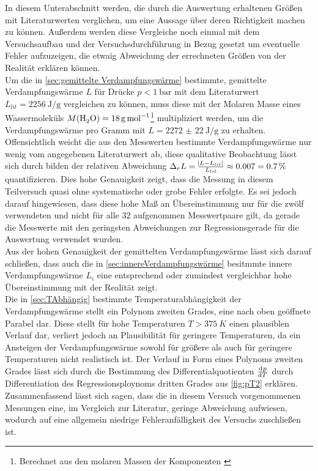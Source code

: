 In diesem Unterabschnitt werden, die durch die Auswertung erhaltenen
Größen mit Literaturwerten verglichen, um eine Aussage über deren 
Richtigkeit machen zu können. Außerdem werden diese Vergleiche noch
einmal mit dem Versuchsaufbau und der Versuchsdurchführung in Bezug
gesetzt um eventuelle Fehler aufzuzeigen, die etwaig Abweichung der 
errechneten Größen von der Realität erklären können.\\

Um die in \autoref{sec:gemittelte Verdampfungswärme} 
bestimmte, gemittelte Verdampfungswärme $L$ für Drücke 
$p < \SI{1}{\bar}$ mit dem Literaturwert $L_{lit} = 
\SI{2256}{\joule\per\g}$ \cite{Mende09}
vergleichen zu können, muss diese mit der 
Molaren Masse eines Wassermoleküls 
$M(\ce{H2O}) = \SI{18}{\g\per\mole}$\footnote{Berechnet aus den molaren Massen der Komponenten \cite{Kuchling07}} multipliziert werden, um die Verdampfungswärme pro Gramm mit 
$L =\SI{2272(22)}{\joule\per\g} $ zu erhalten.
Offensichtlich weicht die aus den Messwerten bestimmte Verdampfungswärme nur wenig vom angegebenen Literaturwert ab, diese qualitative Beobachtung lässt sich durch bilden der 
relativen Abweichung 
$ \Delta_{r} L = \tfrac{\envert{L - L_{lit}}}{L_{lit}} \approx 
\num{0.007} = \SI{0.7}{\percent}$ quantifizieren.
Dies hohe Genauigkeit zeigt, dass die Messung in diesem Teilversuch quasi
ohne systematische oder grobe Fehler erfolgte. Es sei jedoch darauf hingewiesen, dass
diese hohe Maß an Übereinstimmung nur für die zwölf verwendeten und nicht für alle 32 
aufgenommen Messwertpaare gilt, da gerade die Messwerte mit den geringsten Abweichungen 
zur Regressionsgerade für die Auswertung verwendet wurden.\\
Aus der hohen Genauigkeit der gemittelten Verdampfungswärme lässt sich darauf schließen,
dass auch die in \autoref{sec:innereVerdampfungswärme} besitmmte innere Verdampfungswärme
$L_{i}$ eine entsprechend oder zumindest vergleichbar hohe Übereinstimmung mit der Realität zeigt.\\

Die in \autoref{sec:TAbhängig} bestimmte Temperaturabhängigkeit der Verdampfungswärme
stellt ein Polynom zweiten Grades, eine nach oben geöffnete Parabel dar. 
	Diese stellt für hohe Temperaturen $ T > \SI{375}{K} $ einen plausiblen Verlauf dar,
verliert jedoch an Plausibilität für geringere Temperaturen, da ein Ansteigen der
Verdampfungswärme sowohl für größere als auch für geringere Temperaturen nicht
realistisch ist.
Der Verlauf in Form eines Polynoms zweiten Grades lässt sich durch die Bestimmung
des Differentialquotienten $\tod{p}{T}$ durch Differentiation des Regressionsploynoms 
dritten Grades aus \autoref{fig:pT2} erklären.\\


Zusammenfassend lässt sich sagen, dass die in diesem Versuch vorgenommenen Messungen 
eine, im Vergleich zur Literatur, geringe Abweichung aufwiesen, wodurch auf eine allgemein niedrige Fehleranfälligkeit des Versuchs zuschließen ist. 